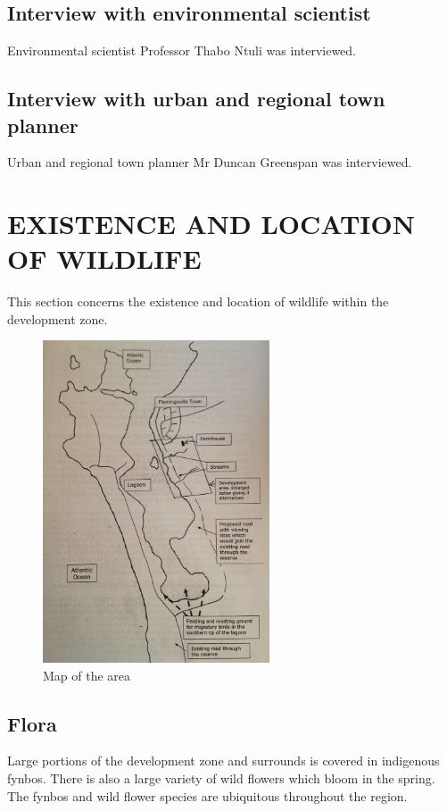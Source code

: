 \documentclass{article}
\begin{document}
\subsection{Interview with environmental scientist}
Environmental scientist Professor Thabo Ntuli was interviewed.

\subsection{Interview with urban and regional town planner}
Urban and regional town planner Mr Duncan Greenspan was interviewed.

\newpage
\section{EXISTENCE AND LOCATION OF WILDLIFE}
This section concerns the existence and location of wildlife within the development zone.

\begin{figure}[h!]
	\centering
	\includegraphics[width=0.6\textwidth]{map}
	\caption{Map of the area}
\end{figure}

\subsection{Flora}
Large portions of the development zone and surrounds is covered in indigenous fynbos. There is also a large variety of wild flowers which bloom in the spring. The fynbos and wild flower species are ubiquitous throughout the region.
\end{document}
